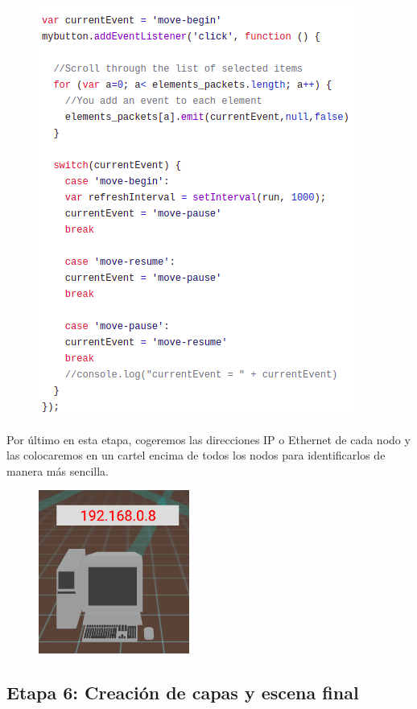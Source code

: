 \documentclass[a4paper, 12pt]{book}
\begin{document}
\begin{figure}[h]
\centering
    \includegraphics[scale=0.65]{img/emit.png}
\end{figure}

Por último en esta etapa, cogeremos las direcciones IP o Ethernet de cada nodo y las colocaremos en un cartel encima de todos los nodos para identificarlos de manera más sencilla.


\begin{figure}[h]
\centering
    \includegraphics[scale=0.7]{img/cartel.png}
\end{figure}

\subsection{Etapa 6: Creación de capas y escena final}
\end{document}
